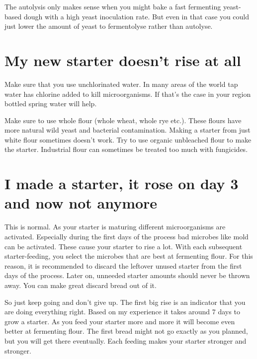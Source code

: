 The autolysis only makes sense when you might
bake a fast fermenting yeast-based dough with a
high yeast inoculation rate. But even in that
case you could just lower the amount of yeast
to fermentolyse rather than autolyse.

\section{My new starter doesn't rise at all}

Make sure that you use unchlorinated water.
In many areas of the world tap water has
chlorine added to kill microorganisms. If that's
the case in your region bottled spring water will
help.

Make sure to use whole flour (whole wheat, whole rye etc.).
These flours have more natural wild yeast and
bacterial contamination. Making a starter
from just white flour sometimes doesn't work.
Try to use organic unbleached flour to make
the starter. Industrial flour can sometimes
be treated too much with fungicides.

\section{I made a starter, it rose on day 3 and now not anymore}

This is normal. As your starter is maturing different
microorganisms are activated. Especially during
the first days of the process bad microbes
like mold can be activated. These cause your
starter to rise a lot. With each subsequent
starter-feeding, you select the microbes that are best
at fermenting flour. For this reason, it is
recommended to discard the leftover unused starter
from the first days of the process. Later on, unneeded
starter amounts should never be thrown away. You can make
great discard bread out of it.

So just keep going and don't give up. The first big
rise is an indicator that you are doing everything
right. Based on my experience it takes around 7
days to grow a starter. As you feed your starter
more and more it will become even better at fermenting
flour. The first bread might not go exactly as you
planned, but you will get there eventually. Each
feeding makes your starter stronger and stronger.
